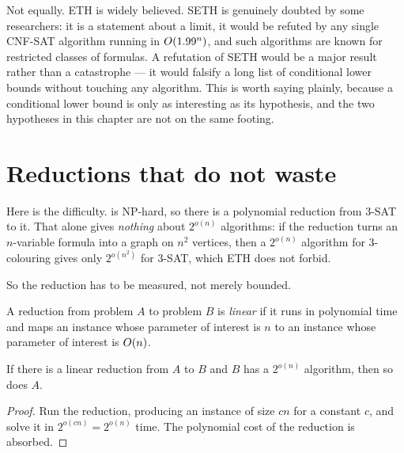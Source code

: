 \begin{remark}\label{rem:believing-eth}
Not equally. ETH is widely believed. SETH is genuinely doubted by some
researchers: it is a statement about a limit, it would be refuted by any single
CNF-SAT algorithm running in $O\!\left(1.99^n\right)$, and such algorithms are known
for restricted classes of formulas. A refutation of SETH would be a major
result rather than a catastrophe --- it would falsify a long list of
conditional lower bounds without touching any algorithm. This is worth saying
plainly, because a conditional lower bound is only as interesting as its
hypothesis, and the two hypotheses in this chapter are not on the same footing.
\end{remark}

\section{Reductions that do not waste}
\label{sec:linear-reductions}

Here is the difficulty.  is \textrm{NP}-hard, so there is a
polynomial reduction from $3$-SAT to it. That alone gives \emph{nothing} about
$2^{o(n)}$ algorithms: if the reduction turns an $n$-variable formula into a
graph on $n^2$ vertices, then a $2^{o(n)}$ algorithm for $3$-colouring gives
only $2^{o(n^2)}$ for $3$-SAT, which ETH does not forbid.

So the reduction has to be measured, not merely bounded.

\begin{definition}\label{def:linear-reduction}
A reduction from problem $A$ to problem $B$ is \emph{linear} if it runs in
polynomial time and maps an instance whose parameter of interest is $n$ to an
instance whose parameter of interest is $O\!\left(n\right)$.
\end{definition}

\begin{lemma}\label{lem:linear-transfer}
If there is a linear reduction from $A$ to $B$ and $B$ has a $2^{o(n)}$
algorithm, then so does $A$.
\end{lemma}

\begin{proof}
Run the reduction, producing an instance of size $cn$ for a constant $c$, and
solve it in $2^{o(cn)} = 2^{o(n)}$ time. The polynomial cost of the reduction
is absorbed.
\end{proof}


